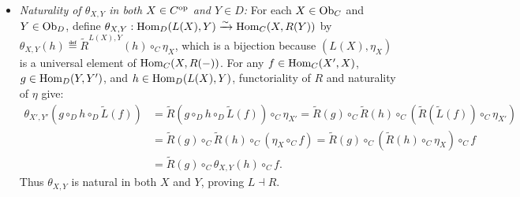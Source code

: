 \documentclass[10pt,a4paper]{article}
\begin{document}
\begin{enumerate}
\begin{itemize}
\item \emph{Naturality of $\theta_{X,Y}$ in both $X \in C^{\textrm{op}}$ and $Y \in D$:} For each $X \in {\textrm{Ob}}_C$ and $Y \in {\textrm{Ob}}_D$, define $\theta_{X,Y} : {\textrm{Hom}}_D(L(X), Y) \xrightarrow{\sim} {\textrm{Hom}}_C(X, R(Y))$ by $\theta_{X,Y}(h) \eqdef \widetilde{R}^{L(X),Y}(h) \circ_C \eta_X$, which is a bijection because $(L(X), \eta_X)$ is a universal element of ${\textrm{Hom}}_C(X, R(-))$. For any $f \in {\textrm{Hom}}_C(X', X)$, $g \in {\textrm{Hom}}_D(Y, Y')$, and $h \in {\textrm{Hom}}_D(L(X), Y)$, functoriality of $R$ and naturality of $\eta$ give:
\begin{align*}
\theta_{X',Y'}\left(g \circ_D h \circ_D \widetilde{L}(f)\right) &= \widetilde{R}\left(g \circ_D h \circ_D \widetilde{L}(f)\right) \circ_C \eta_{X'} = \widetilde{R}(g) \circ_C \widetilde{R}(h) \circ_C \left(\widetilde{R}(\widetilde{L}(f)) \circ_C \eta_{X'}\right) \\
&= \widetilde{R}(g) \circ_C \widetilde{R}(h) \circ_C \left(\eta_X \circ_C f\right) = \widetilde{R}(g) \circ_C \left(\widetilde{R}(h) \circ_C \eta_X\right) \circ_C f \\
&= \widetilde{R}(g) \circ_C \theta_{X,Y}(h) \circ_C f.
\end{align*}
Thus $\theta_{X,Y}$ is natural in both $X$ and $Y$, proving $L \dashv R$.
\end{itemize}
\end{enumerate}
\myqed
\end{document}
